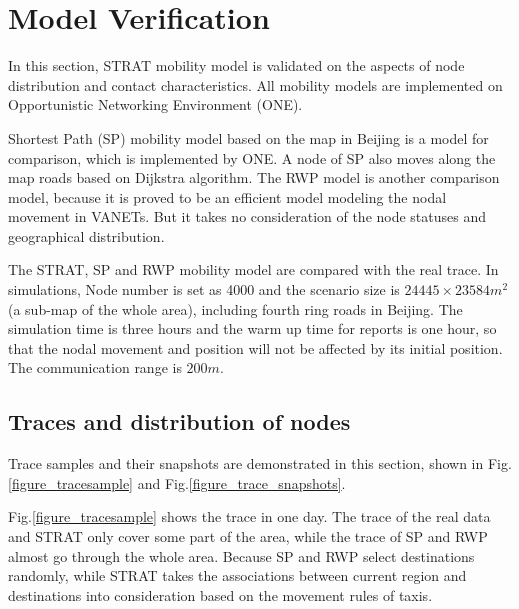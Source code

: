 \section{Model Verification}
\label{section_model_varification}
In this section, STRAT mobility model is validated on the aspects of node distribution and contact characteristics. All mobility models are implemented on Opportunistic Networking Environment (ONE)\cite{KeranenOtt-155}.

Shortest Path (SP) mobility model based on the map in Beijing is a model for comparison, which is implemented by ONE.  A node of SP also moves along the map roads based on Dijkstra algorithm.
The RWP model is another comparison model, because it is proved to be an efficient model modeling the nodal movement in VANETs. But it takes no consideration of the node statuses and geographical distribution.

The STRAT, SP and RWP mobility model are compared with the real trace.
In simulations, Node number is set as 4000 and the scenario size is $24445\times23584 m^2$ (a sub-map of the whole area), including fourth ring roads in Beijing. The simulation time is three hours and the warm up time for reports is one hour, so that the nodal movement and position will not be affected by its initial position. The communication range is $200m$.

\subsection{Traces and distribution of nodes}

Trace samples and their snapshots are demonstrated in this section, shown in Fig. \ref{figure_tracesample} and Fig.\ref{figure_trace_snapshots}.




Fig.\ref{figure_tracesample} shows the trace in one day. The trace of the real data and STRAT only cover some part of the area, while the trace of SP and RWP almost go through the whole area. Because SP and RWP select destinations randomly, while STRAT takes the associations between current region and destinations into consideration based on the movement rules of taxis.

